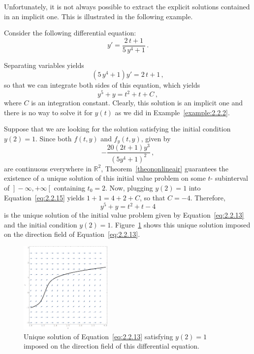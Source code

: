 Unfortunately, it is not always possible to extract the explicit solutions contained in an implicit one. This is illustrated in the following example. 

\begin{example}\label{example:2.2.3} 
Consider the following differential equation:
\begin{equation} \label{eq:2.2.13}
y'=\dfrac{2\,t+1}{5\,y^4+1}\,.
\end{equation}

Separating variables yields
$$
\left(5\,y^4+1\right)y'=2\,t+1\,,
$$
so that we can integrate both sides of this equation, which yields
\begin{equation} \label{eq:2.2.15}
y^5+y=t^2+t+ C\,,
\end{equation}
where $C$ is an integration constant. Clearly, this solution is an implicit one and there is no way to solve it for $y(t)$ as we did in Example~\ref{example:2.2.2}.

Suppose that we are looking for the solution satisfying the initial condition $y(2)=1$. Since both $f(t,y)$ and $f_y(t,y)$, given by
$$
-\frac{20 (2 t+1) y^3}{\left(5 y^4+1\right)^2}\,,
$$
are continuous everywhere in $\mathbb{R}^2$, Theorem~\ref{theononlineair} guarantees the existence of a unique solution of this initial value problem on some $t$- subinterval of $\left.\right]-\infty,+\infty\left[\right.$ containing $t_0=2$. Now, plugging $y(2)=1$ into Equation~\eqref{eq:2.2.15} yields $1+1=4+2+C$, so that $C=-4$. Therefore, 
$$
y^5+y=t^2+t-4
$$
is the unique solution of the initial value problem given by Equation~\eqref{eq:2.2.13} and the initial condition $y(2)=1$. Figure~\ref{etsepimplicit} shows this unique solution imposed on the direction field of Equation~\eqref{eq:2.2.13}.


\begin{figure}[H]
	\begin{center}
			\includegraphics[width=0.4\textwidth]{exsepimplicit}
	\caption{Unique solution  of Equation~\eqref{eq:2.2.13} satisfying $y(2)=1$ imposed on the direction field of this differential equation.}
	\label{etsepimplicit}
	\end{center}
\end{figure}


\end{example}

